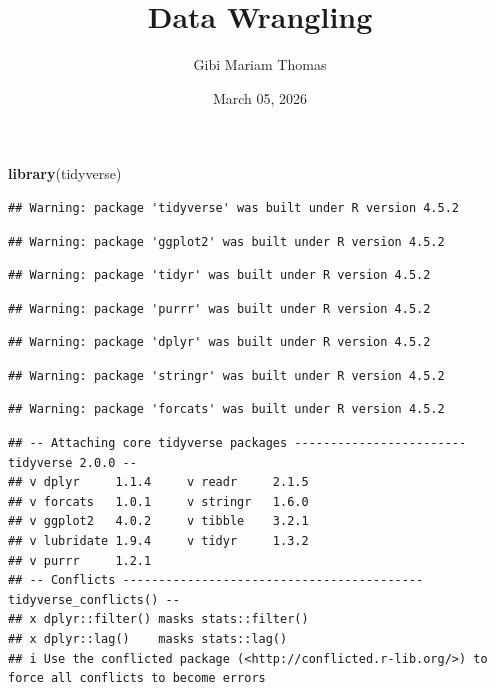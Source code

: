 \documentclass[
]{article}
\title{Data Wrangling}
\author{Gibi Mariam Thomas}
\date{March 05, 2026}
\newenvironment{Shaded}{\begin{snugshade}}{\end{snugshade}}
\newcommand{\FunctionTok}[1]{\textcolor[rgb]{0.13,0.29,0.53}{\textbf{#1}}}
\newcommand{\NormalTok}[1]{#1}
\begin{document}
\maketitle

\begin{Shaded}
\begin{Highlighting}[]
\FunctionTok{library}\NormalTok{(tidyverse)}
\end{Highlighting}
\end{Shaded}

\begin{verbatim}
## Warning: package 'tidyverse' was built under R version 4.5.2
\end{verbatim}

\begin{verbatim}
## Warning: package 'ggplot2' was built under R version 4.5.2
\end{verbatim}

\begin{verbatim}
## Warning: package 'tidyr' was built under R version 4.5.2
\end{verbatim}

\begin{verbatim}
## Warning: package 'purrr' was built under R version 4.5.2
\end{verbatim}

\begin{verbatim}
## Warning: package 'dplyr' was built under R version 4.5.2
\end{verbatim}

\begin{verbatim}
## Warning: package 'stringr' was built under R version 4.5.2
\end{verbatim}

\begin{verbatim}
## Warning: package 'forcats' was built under R version 4.5.2
\end{verbatim}

\begin{verbatim}
## -- Attaching core tidyverse packages ------------------------ tidyverse 2.0.0 --
## v dplyr     1.1.4     v readr     2.1.5
## v forcats   1.0.1     v stringr   1.6.0
## v ggplot2   4.0.2     v tibble    3.2.1
## v lubridate 1.9.4     v tidyr     1.3.2
## v purrr     1.2.1     
## -- Conflicts ------------------------------------------ tidyverse_conflicts() --
## x dplyr::filter() masks stats::filter()
## x dplyr::lag()    masks stats::lag()
## i Use the conflicted package (<http://conflicted.r-lib.org/>) to force all conflicts to become errors
\end{verbatim}
\end{document}
